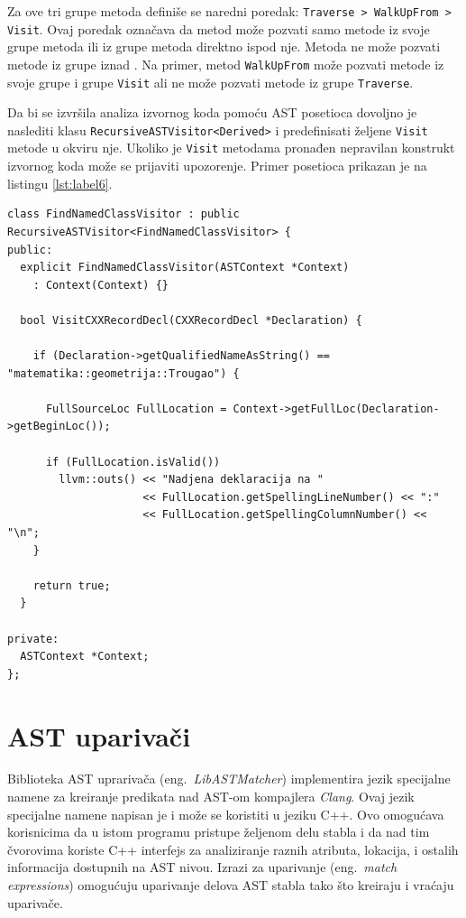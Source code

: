\documentclass[12pt,oneside]{memoir}
\begin{document}
Za ove tri grupe metoda defini\v{s}e se naredni poredak: \texttt{Traverse > WalkUpFrom > Visit}. Ovaj poredak ozna\v{c}ava da metod mo\v{z}e pozvati samo metode iz svoje grupe metoda ili iz grupe metoda direktno ispod nje. Metoda ne mo\v{z}e pozvati metode iz grupe iznad \cite{visitors}. Na primer, metod \texttt{WalkUpFrom} mo\v{z}e pozvati metode iz svoje grupe i grupe \texttt{Visit} ali 
ne mo\v{z}e pozvati metode iz grupe \texttt{Traverse}.

\par
Da bi se izvršila analiza izvornog koda pomoću AST posetioca dovoljno je naslediti klasu 
 \texttt{RecursiveASTVisitor<Derived>} i predefinisati željene \texttt{Visit} metode u okviru nje. Ukoliko je \texttt{Visit} metodama pronađen nepravilan konstrukt izvornog koda mo\v{z}e se prijaviti upozorenje. Primer posetioca prikazan je na listingu \ref{lst:label6}.

\begin{lstlisting}[style=customc, basicstyle=\tiny, caption={Primer posetioaca koji pose\'{c}uje sve strukture, unije i klase i ispisuje lokaciju onih \v{c}iji naziv je \texttt{matematika::geometrija::Trougao}.},label=lst:label6]
class FindNamedClassVisitor : public RecursiveASTVisitor<FindNamedClassVisitor> {
public:
  explicit FindNamedClassVisitor(ASTContext *Context)
    : Context(Context) {}

  bool VisitCXXRecordDecl(CXXRecordDecl *Declaration) {

    if (Declaration->getQualifiedNameAsString() == "matematika::geometrija::Trougao") {

      FullSourceLoc FullLocation = Context->getFullLoc(Declaration->getBeginLoc());

      if (FullLocation.isValid())
        llvm::outs() << "Nadjena deklaracija na "
                     << FullLocation.getSpellingLineNumber() << ":"
                     << FullLocation.getSpellingColumnNumber() << "\n";
    }

    return true;
  }

private:
  ASTContext *Context;
};
\end{lstlisting}


\section{AST upariva\v{c}i}

Biblioteka AST uprariva\v{c}a (eng.~\textit{LibASTMatcher}) implementira jezik specijalne namene za kreiranje predikata nad AST-om kompajlera \textit{Clang}. Ovaj jezik specijalne namene napisan je i može se koristiti u jeziku C++. Ovo omogućava korisnicima da u istom programu pristupe željenom delu stabla i da nad tim čvorovima koriste C++ interfejs za analiziranje raznih atributa, lokacija, i ostalih informacija dostupnih na AST nivou. Izrazi za uparivanje (eng.~\textit{match expressions}) omogu\'{c}uju uparivanje delova AST stabla tako \v{s}to kreiraju i vra\'{c}aju upariva\v{c}e.
\end{document}
